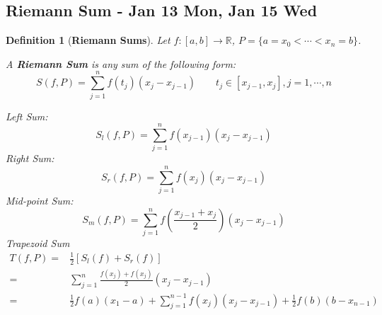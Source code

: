 \documentclass[12pt]{article}
\theoremstyle{plain}
\newtheorem{definition}{Definition}[subsection]
\begin{document}
	\newpage
	\subsection{Riemann Sum - Jan 13 Mon, Jan 15 Wed}
	\begin{definition}[\textbf{Riemann Sums}]
		Let $f:[a,b]\to \mathbb{R}$, $P=\{a=x_0<\cdots<x_n=b\}$.

		A \textbf{Riemann Sum} is any sum of the following form: 
		\[
			S(f,P) = \sum_{j=1}^n f(t_j)(x_j-x_{j-1}) \qquad 
			t_j\in[x_{j-1},x_j], j = 1,\cdots, n
		\]
		
		Left Sum: 
		\[
			S_l(f,P) = \sum_{j=1}^n f(x_{j-1}) (x_j-x_{j-1})
		\]
		Right Sum: 
		\[
			S_r(f,P) = \sum_{j=1}^n f(x_{j}) (x_j-x_{j-1})
		\]
		Mid-point Sum: 
		\[
			S_m(f,P) =\sum_{j=1}^n f(\frac{x_{j-1}+x_j}2) (x_j-x_{j-1})
		\]
		Trapezoid Sum
		\begin{align*}
			T(f,P) 
			=& \frac 12 [S_l(f)+S_r(f)]\\
			=& \sum_{j=1}^n \frac{f(x_j)+f(x_j)}2 (x_j-x_{j-1})\\
			=& \frac 12 f(a)(x_1-a) +\sum_{j=1}^{n-1} f(x_j)(x_j-x_{j-1})
			+\frac 12 f(b) (b-x_{n-1})
		\end{align*}
	\end{definition}
\end{document}
